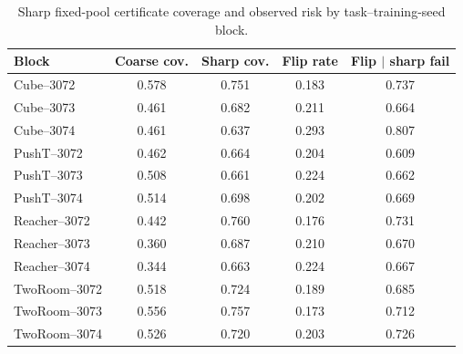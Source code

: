 \begin{table}[H]
\centering
\caption{Sharp fixed-pool certificate coverage and observed risk by task--training-seed block.}
\label{tab:fixed-pool-certificate-coverage}
\begin{tabular}{lcccc}
\toprule
Block & Coarse cov. & Sharp cov. & Flip rate & Flip $\mid$ sharp fail \\
\midrule
Cube--3072 & 0.578 & 0.751 & 0.183 & 0.737 \\
Cube--3073 & 0.461 & 0.682 & 0.211 & 0.664 \\
Cube--3074 & 0.461 & 0.637 & 0.293 & 0.807 \\
PushT--3072 & 0.462 & 0.664 & 0.204 & 0.609 \\
PushT--3073 & 0.508 & 0.661 & 0.224 & 0.662 \\
PushT--3074 & 0.514 & 0.698 & 0.202 & 0.669 \\
Reacher--3072 & 0.442 & 0.760 & 0.176 & 0.731 \\
Reacher--3073 & 0.360 & 0.687 & 0.210 & 0.670 \\
Reacher--3074 & 0.344 & 0.663 & 0.224 & 0.667 \\
TwoRoom--3072 & 0.518 & 0.724 & 0.189 & 0.685 \\
TwoRoom--3073 & 0.556 & 0.757 & 0.173 & 0.712 \\
TwoRoom--3074 & 0.526 & 0.720 & 0.203 & 0.726 \\
\bottomrule
\end{tabular}
\end{table}

